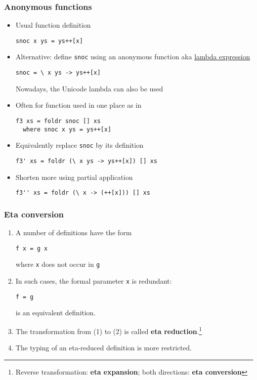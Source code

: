\documentclass{beamer}
\begin{document}
\begin{frame}[fragile]
  \frametitle{Anonymous functions}
  \begin{itemize}
  \item<+-> Usual function definition
\begin{verbatim}
snoc x ys = ys++[x]
\end{verbatim}
  \item<+->
  Alternative: define \texttt{snoc} using an anonymous function aka
  \href{https://en.wikipedia.org/wiki/Anonymous_function}{lambda
    expression} 
\begin{verbatim}
snoc = \ x ys -> ys++[x]
\end{verbatim}
  Nowadays, the Unicode lambda can also be used
\item<+->
  Often for function used in one place as in
\begin{verbatim}
f3 xs = foldr snoc [] xs
  where snoc x ys = ys++[x]
\end{verbatim}
\item<+-> Equivalently replace \texttt{snoc} by its definition
\begin{verbatim}
f3' xs = foldr (\ x ys -> ys++[x]) [] xs
\end{verbatim}
\item<+-> Shorten more using partial application
\begin{verbatim}
f3'' xs = foldr (\ x -> (++[x])) [] xs
\end{verbatim}
\end{itemize}
\end{frame}
\begin{frame}[fragile]
  \frametitle{Eta conversion}
  \begin{enumerate}
  \item A number of definitions have the form
\begin{verbatim}
f x = g x
\end{verbatim}
    where \texttt{x} does not occur in \texttt{g}
  \item 
    In such cases, the formal parameter \texttt{x} is redundant:
\begin{verbatim}
f = g
\end{verbatim}
    is an equivalent definition.
  \item The transformation from (1) to (2) is called \textbf{eta reduction}.\footnote{Reverse transformation: \textbf{eta expansion}; both directions: \textbf{eta conversion}}
  \item The typing of an eta-reduced definition is more restricted.
\end{enumerate}
\end{frame}
\end{document}
